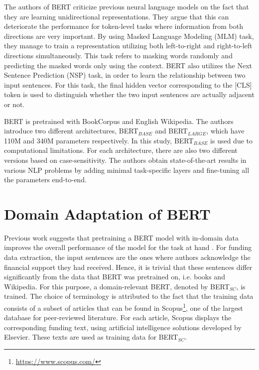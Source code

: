 \documentclass{report}
\theoremstyle{definition}
\theoremstyle{remark}
\begin{document}
The authors of BERT criticize previous neural language models on the fact that they are learning unidirectional representations. They argue that this can deteriorate the performance for token-level tasks where information from both directions are very important. By using Masked Language Modeling (MLM) task, they manage to train a representation utilizing both left-to-right and right-to-left directions simultaneously. This task refers to masking words randomly and predicting the masked words only using the context. BERT also utilizes the Next Sentence Prediction (NSP) task, in order to learn the relationship between two input sentences. For this task, the final hidden vector corresponding to the [CLS] token is used to distinguish whether the two input sentences are actually adjacent or not.

BERT is pretrained with BookCorpus \cite{bookscorpus} and English Wikipedia. The authors introduce two different architectures, BERT$_{BASE}$ and BERT$_{LARGE}$, which have 110M and 340M parameters respectively. In this study, BERT$_{BASE}$ is used due to computational limitations. For each architecture, there are also two different versions based on case-sensitivity. The authors obtain state-of-the-art results in various NLP problems by adding minimal task-specific layers and fine-tuning all the parameters end-to-end.

\section{Domain Adaptation of BERT}
Previous work suggests that pretraining a BERT model with in-domain data improves the overall performance of the model for the task at hand \cite{DontStop,exBERT,quote3}. For funding data extraction, the input sentences are the ones where authors acknowledge the financial support they had received. Hence, it is trivial that these sentences differ significantly from the data that BERT was pretrained on, i.e. books and Wikipedia.  For this purpose, a domain-relevant BERT, denoted by BERT$_{SC}$, is trained. The choice of terminology is attributed to the fact that the training data consists of a subset of articles that can be found in Scopus\footnote{\url{https://www.scopus.com/}}, one of the largest database for peer-reviewed literature. For each article, Scopus displays the corresponding funding text, using artificial intelligence solutions developed by Elsevier. These texts are used as training data for BERT$_{SC}$.
\end{document}
